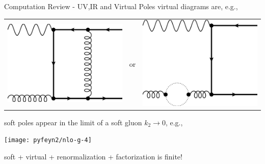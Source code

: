\begin{frame}{Computation Review - UV,IR and Virtual Poles}
virtual diagrams are, e.g.,
\begin{center}
\begin{tabular}{wnw}
\includegraphics[width=.25\textwidth]{img/nlo-v-1}
&or
&\includegraphics[width=.25\textwidth]{img/nlo-v-5}
\end{tabular}
\end{center}

soft poles appear in the limit of a soft gluon $k_2\rightarrow 0$, e.g.,
\begin{center}
\texttt{[image: pyfeyn2/nlo-g-4]}
\end{center}

soft + virtual + renormalization + factorization is finite!
\end{frame}
